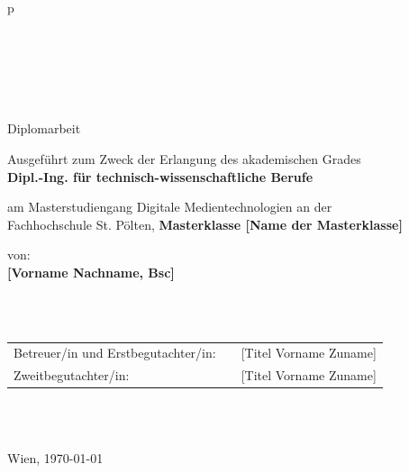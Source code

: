 \begin{center}
\begin{tabular}{p{\textwidth}}
 

\\
\begin{center}
\Huge{{}}
\end{center}

\\

\begin{center}
\LARGE{{}}
\end{center}

\\

\begin{center}
\LARGE{Diplomarbeit}
\end{center}


\begin{center}
Ausgeführt zum Zweck der Erlangung des akademischen Grades\\ 
\textbf{Dipl.-Ing. für technisch-wissenschaftliche Berufe }
 
\end{center}


\begin{center}
am Masterstudiengang Digitale Medientechnologien an der \\
Fachhochschule St. Pölten, \textbf{Masterklasse [Name der Masterklasse]} \\
\end{center}



\begin{center}
von:\\
\fontsize{15pt}{15pt}\selectfont
\textbf{[Vorname Nachname, Bsc]} \\
\fontsize{12pt}{15pt}\selectfont
[Matrikelnummer]
\end{center}



\\

\\

\begin{center}
\begin{tabular}{lll}
Betreuer/in und Erstbegutachter/in: & & [Titel Vorname Zuname]\\
Zweitbegutachter/in: & & [Titel Vorname Zuname]
\end{tabular}
\end{center}
\\
\\
\begin{center}
\large{Wien, \today}
\end{center}


\end{tabular}
\end{center}